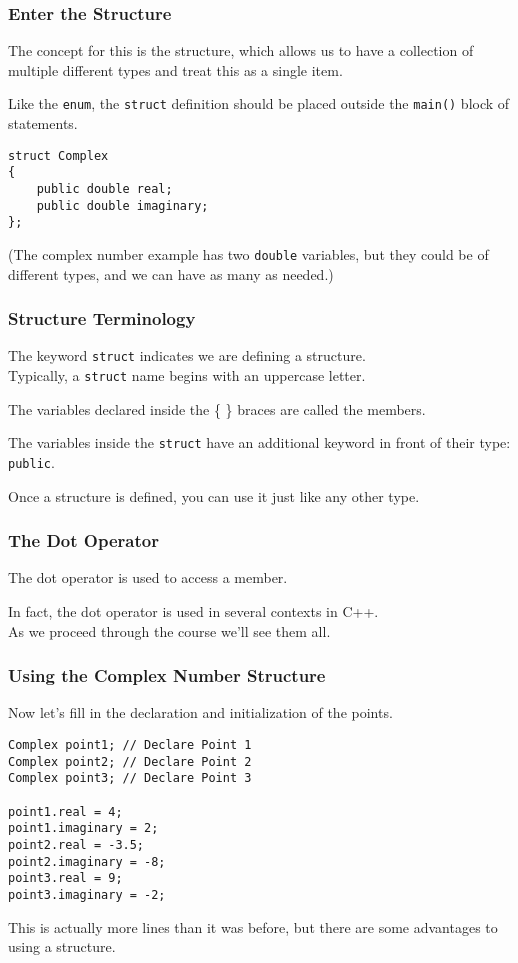 \begin{frame}[fragile]
\frametitle{Enter the Structure}

The concept for this is the \alert{structure}, which allows us to have a collection of multiple different types and treat this as a single item.

Like the \texttt{enum}, the \texttt{struct} definition should be placed outside the \texttt{main()} block of statements.

\begin{verbatim}
struct Complex
{
    public double real;
    public double imaginary;
};
\end{verbatim}

(The complex number example has two \texttt{double} variables, but they could be of different types, and we can have as many as needed.)

\end{frame}

\begin{frame}
\frametitle{Structure Terminology}
The keyword \texttt{struct} indicates we are defining a structure.\\
\quad Typically, a \texttt{struct} name begins with an uppercase letter.

The variables declared inside the \{ \} braces are called the \alert{members}.

The variables inside the \texttt{struct} have an additional keyword in front of their type: \texttt{public}.

Once a structure is defined, you can use it just like any other type.

\end{frame}

\begin{frame}
\frametitle{The Dot Operator}
The \alert{dot operator} is used to access a member.

In fact, the dot operator is used in several contexts in C++.\\
\quad As we proceed through the course we'll see them all.

\end{frame}

\begin{frame}[fragile]
\frametitle{Using the Complex Number Structure}

Now let's fill in the declaration and initialization of the points.

\begin{verbatim}
Complex point1; // Declare Point 1
Complex point2; // Declare Point 2
Complex point3; // Declare Point 3

point1.real = 4;
point1.imaginary = 2;
point2.real = -3.5;
point2.imaginary = -8;
point3.real = 9;
point3.imaginary = -2;

\end{verbatim}

This is actually more lines than it was before, but there are some advantages to using a structure.

\end{frame}

